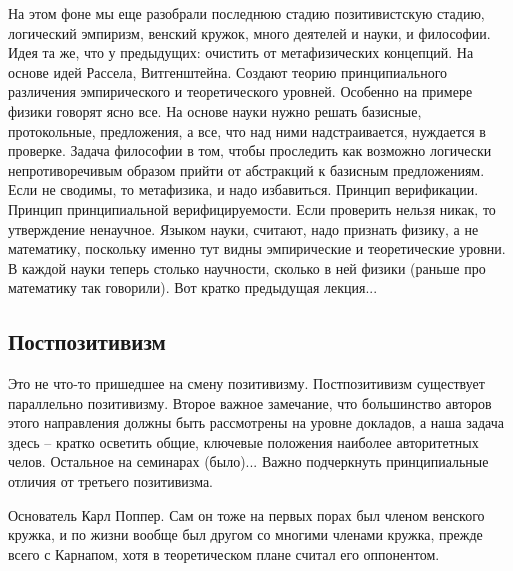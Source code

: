 \documentclass[a4paper, 12pt]{article}
\begin{document}
На этом фоне мы еще разобрали последнюю стадию позитивистскую стадию, 
логический эмпиризм, венский кружок, много деятелей и науки, 
и философии. Идея та же, что у предыдущих: очистить от метафизических 
концепций. На основе идей Рассела, Витгенштейна. Создают теорию 
принципиального различения эмпирического и теоретического уровней. 
Особенно на примере физики говорят ясно все. На основе науки нужно 
решать базисные, протокольные, предложения, а все, что над ними 
надстраивается, нуждается в проверке. Задача философии в том, чтобы 
проследить как возможно логически непротиворечивым образом прийти от 
абстракций к базисным предложениям. Если не сводимы, то метафизика, 
и надо избавиться. Принцип верификации. Принцип принципиальной 
верифицируемости. Если проверить нельзя никак, то утверждение ненаучное. 
Языком науки, считают, надо признать физику, а не математику, поскольку 
именно тут видны эмпирические и теоретические уровни. В каждой науки 
теперь столько научности, сколько в ней физики (раньше про математику 
так говорили). Вот кратко предыдущая лекция...

\subsection{Постпозитивизм}

Это не что-то пришедшее на смену позитивизму. Постпозитивизм существует 
параллельно позитивизму. Второе важное замечание, что большинство 
авторов этого направления должны быть рассмотрены на уровне докладов, 
а наша задача здесь -- кратко осветить общие, ключевые положения 
наиболее авторитетных челов. Остальное на семинарах (было)... Важно 
подчеркнуть принципиальные отличия от третьего позитивизма.

Основатель Карл Поппер. Сам он тоже на первых порах был членом венского 
кружка, и по жизни вообще был другом со многими членами кружка, прежде 
всего с Карнапом, хотя в теоретическом плане считал его оппонентом.
\end{document}
